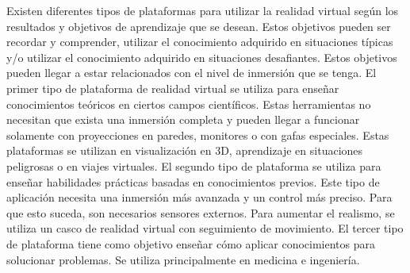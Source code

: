 Existen diferentes tipos de plataformas para utilizar la realidad virtual según los resultados y objetivos de aprendizaje que se desean. Estos objetivos pueden ser recordar y comprender, utilizar el conocimiento adquirido en situaciones típicas y/o utilizar el conocimiento adquirido en situaciones desafiantes. Estos objetivos pueden llegar a estar relacionados con el nivel de inmersión que se tenga. El primer tipo de plataforma de realidad virtual se utiliza para enseñar conocimientos teóricos en ciertos campos científicos. Estas herramientas no necesitan que exista una inmersión completa y pueden llegar a funcionar solamente con proyecciones en paredes, monitores o con gafas especiales. Estas plataformas se utilizan en visualización en 3D, aprendizaje en situaciones peligrosas o en viajes virtuales. El segundo tipo de plataforma se utiliza para enseñar habilidades prácticas basadas en conocimientos previos. Este tipo de aplicación necesita una inmersión más avanzada y un control más preciso. Para que esto suceda, son necesarios sensores externos. Para aumentar el realismo, se utiliza un casco de realidad virtual con seguimiento de movimiento. El tercer tipo de plataforma tiene como objetivo enseñar cómo aplicar conocimientos para solucionar problemas. Se utiliza principalmente en medicina e ingeniería. \parencite{kaminska2019virtual}
